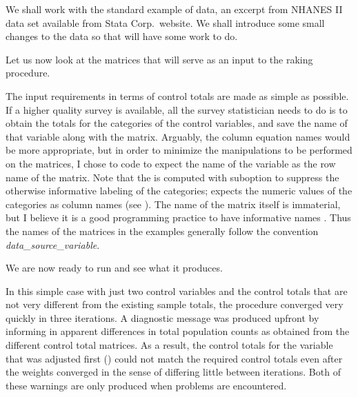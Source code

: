 \begin{stexample}[Example 1]

We shall work with the standard example of  data,
an excerpt from NHANES II data set available from Stata Corp.\ website.
We shall introduce some small changes to the data so that
 will have some work to do.

\begin{stlog}
\nullskip
\end{stlog}

Let us now look at the matrices that will serve as an input to the
raking procedure.

\begin{stlog}
\nullskip
\end{stlog}

The input requirements in terms of control totals are made as simple as possible.
If a higher quality survey is available, all the survey statistician needs to do
is to obtain the totals for the categories of the control variables,
and save the name of that variable along with the matrix.
Arguably, the column equation names would be more appropriate,
but in order to minimize the manipulations to be performed on the
matrices, I chose to code  to expect the name
of the variable as the row name of the matrix. Note that the 
is computed with  suboption to suppress
the otherwise informative labeling of the categories;
 expects the numeric values of the categories
as column names (see ).
The name of the matrix itself is immaterial, but I believe it is
a good programming practice
to have informative names \citep{mcconnell:2004}. Thus the names
of the matrices in the examples generally follow the convention
{\it data{\_}source}{\_}{\it variable}.

We are now ready to run  and see what it produces.

\begin{stlog}
\nullskip
\end{stlog}

In this simple case with just two control variables
and the control totals that are not very different from the
existing sample totals, the procedure converged very quickly
in three iterations. A diagnostic message was produced upfront
by  informing in apparent differences in
total population counts as obtained from the different
control total matrices. As a result, the control totals
for the variable that was adjusted first ()
could not match the required control totals even after the
weights converged in the sense of differing little between
iterations. Both of these warnings are only produced when
problems are encountered.


\end{stexample}
